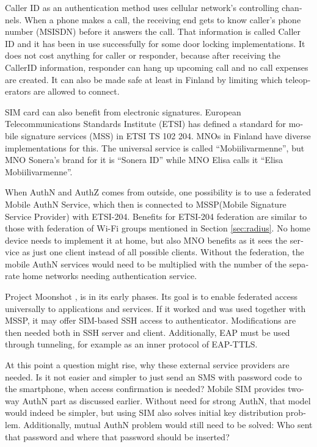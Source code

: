 \documentclass[12pt,a4paper,english]{tutthesis}
\begin{document}
\begin{otherlanguage}{english}
Caller ID as an authentication method uses cellular network's controlling
channels. When a phone makes a call, the receiving end gets 
to know caller's phone number (MSISDN) before it answers the call.
That information is called Caller ID and it has been in use
successfully for some door locking implementations. 
It does not cost anything for caller or responder,
because after receiving the CallerID  information, responder can hang
up upcoming call and no call expenses are created.
 It can also be made safe at least in Finland
by limiting which teleoperators are allowed to connect.














SIM card can also benefit from electronic signatures.
European Telecommunications Standards Institute (ETSI) has defined a
standard for mobile signature services (MSS) in ETSI TS 102 204.
MNOs in Finland have diverse implementations for this. The universal 
service is called ``Mobiilivarmenne'', but MNO Sonera's brand for it
is ``Sonera ID'' while MNO Elisa calls it ``Elisa Mobiilivarmenne''.

When AuthN and AuthZ comes from outside, one possibility is to use a
federated Mobile AuthN Service, which then is connected to  MSSP(Mobile
Signature Service Provider) with ETSI-204. Benefits for ETSI-204
federation are similar to those with federation of Wi-Fi groups
mentioned in Section \ref{sec:radius}. No home device needs to implement it
at home, but also MNO benefits as it sees the service as just one
client instead of all possible clients.  Without the federation, the mobile AuthN services would need to be
multiplied with the number of the separate home networks needing authentication service.



Project Moonshot \cite{moonshot}, is in its early phases. Its goal is
to enable federated access universally to applications and
services. If it worked and was used together with MSSP, it may offer
SIM-based SSH access to authenticator. Modifications are then needed 
both in SSH server and client. Additionally, EAP must be used through
tunneling, for example as an inner protocol of EAP-TTLS.

At this point a question might rise, why these external service
providers are needed. Is it not easier and simpler to just send 
an SMS with password code to the smartphone, when access confirmation is needed?
Mobile SIM provides two-way AuthN part as discussed earlier.
Without need for strong AuthN, that model would indeed be 
simpler, but using SIM also solves initial key distribution problem.
Additionally, mutual AuthN problem would still need to be solved:
Who sent that password and where that password should be inserted?


\end{otherlanguage}
\end{document}
